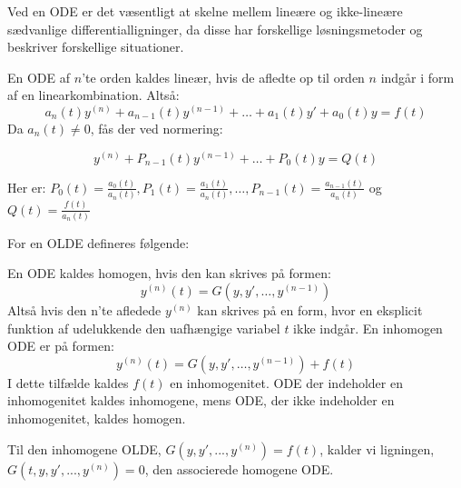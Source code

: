 Ved en ODE er det væsentligt at skelne mellem lineære og ikke-lineære sædvanlige differentialligninger, da disse har forskellige løsningsmetoder og beskriver forskellige situationer.

\begin{definition}\label{OLDE}En ODE af $n$'te orden kaldes lineær, hvis de afledte op til orden $n$ indgår i form af en linearkombination. Altså: \\ 
$$a_{n}(t)y^{(n)}  + a_{n-1}(t)y^{(n-1)}+ \hdots + a_{1}(t)y' + a_{0}(t)y = f(t)$$
Da $a_n(t)\neq 0$, fås der ved normering:

$$y^{(n)}+P_{n-1}(t)y^{(n-1)}+\hdots +P_0(t)y=Q(t)$$ 

Her er: $P_0(t)=\frac{a_0(t)}{a_n(t)} , P_1(t)=\frac{a_1(t)}{a_n(t)}, \hdots, P_{n-1}(t)=\frac{a_{n-1}(t)}{a_n(t)}$ og $Q(t)=\frac{f(t)}{a_n(t)}$
\end{definition}

For en OLDE defineres følgende: 
\begin{definition}[Homogenitet]
En ODE kaldes homogen, hvis den kan skrives på formen: 
$$y^{(n)}(t)=G(y,y', \hdots, y^{(n-1)})$$ 
Altså hvis den n'te afledede $y^{(n)}$ kan skrives på en form, hvor en eksplicit funktion af udelukkende den uafhængige variabel $t$ ikke indgår. En inhomogen ODE er på formen: 
$$y^{(n)}(t)=G(y,y',\hdots, y^{(n-1)})+f(t)$$
I dette tilfælde kaldes $f(t)$ en inhomogenitet. ODE der indeholder en inhomogenitet kaldes inhomogene, mens ODE, der ikke indeholder en inhomogenitet, kaldes homogen.
\end{definition}
Til den inhomogene OLDE, $G(y,y',...,y^{(n)})=f(t)$, kalder vi ligningen, $G(t,y,y',...,y^{(n)})=0$, den associerede homogene ODE. 



